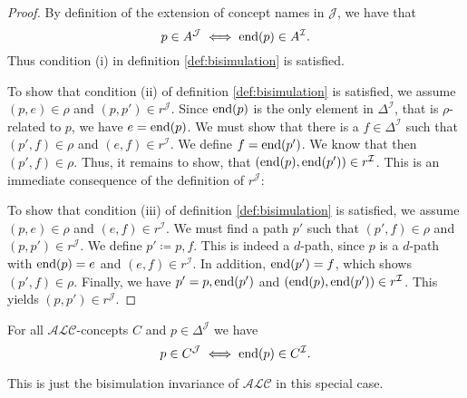 \begin{proof}
	By definition of the extension of concept names in $\mathcal{J}$, we have that
	\[
		p \in A^{\mathcal{J}} \iff \operatorname{\text{end}}(p) \in A^{\mathcal{I}}
	.\]
	Thus condition (i) in definition \ref{def:bisimulation} is satisfied.

	To show that condition (ii) of definition \ref{def:bisimulation} is satisfied, 
	we assume $(p,e) \in \rho$ and $(p,p') \in r^\mathcal{J}$.
	Since $\operatorname{\text{end}}(p)$ is the only element in $\Delta^{\mathcal{I}}$, that is $\rho$-related to $p$,
	we have $e = \operatorname{\text{end}}(p)$.
	We must show that there is a $f \in \Delta^{\mathcal{I}}$ such that $(p',f) \in \rho$ and $(e,f) \in r^{\mathcal{I}}$.
	We define $f = \operatorname{\text{end}}(p')$.
	We know that then $(p',f) \in \rho$.
	Thus, it remains to show, that $(\operatorname{\text{end}}(p),\operatorname{\text{end}}(p')) \in r^{\mathcal{I}}$.
	This is an immediate consequence of the definition of $r^{\mathcal{J}}$:

	To show that condition (iii) of definition \ref{def:bisimulation} is satisfied,
	we assume $(p,e) \in \rho$ and $(e,f) \in r^{\mathcal{I}}$.
	We must find a path $p'$ such that $(p',f) \in \rho$ and $(p,p') \in r^{\mathcal{J}}$.
	We define $p' \coloneqq p,f$.
	This is indeed a $d$-path, since $p$ is a $d$-path with $\operatorname{\text{end}}(p) = e$ 
	and $(e,f) \in r^{\mathcal{I}}$.
	In addition, $\operatorname{\text{end}}(p') = f$, which shows $(p',f) \in \rho$.
	Finally, we have $p' = p,\operatorname{\text{end}}(p')$ and $(\operatorname{\text{end}}(p), \operatorname{\text{end}}(p')) \in r^\mathcal{I}$.
	This yields $(p,p') \in r^\mathcal{J}$.
\end{proof}

\begin{prop}\label{prop:tree model invariance}
	For all $\mathcal{ALC}$-concepts $C$ and $p \in \Delta^{\mathcal{J}}$ we have
	\[
		p \in C^{\mathcal{J}} \iff \operatorname{\text{end}}(p) \in C^{\mathcal{I}}
	.\]
\end{prop}
This is just the bisimulation invariance of $\mathcal{ALC}$ in this special case.

